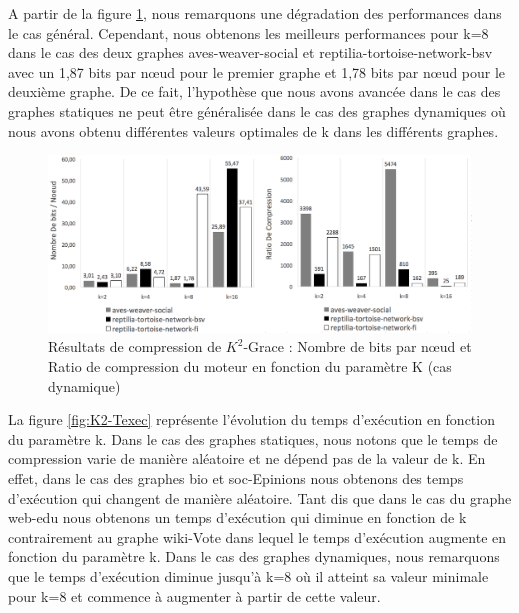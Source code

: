 A partir de la figure \ref{fig:K2-dyn-paraK-NBbits}, nous remarquons une dégradation des performances dans le cas général. Cependant, nous obtenons les meilleurs performances pour k=8 dans le cas des deux graphes aves-weaver-social et reptilia-tortoise-network-bsv avec un 1,87 bits par nœud pour le premier graphe et 1,78 bits par nœud pour le deuxième graphe. De ce fait, l'hypothèse que nous avons avancée dans le cas des graphes statiques ne peut être généralisée dans le cas des graphes dynamiques où nous avons obtenu différentes valeurs optimales de k dans les différents graphes. 
\begin{figure}[H]
	\centering
	\includegraphics[scale=0.38]{ressources/image/ratioik2.png}
	
	\caption{Résultats de compression de $K^2$-Grace : Nombre de bits par nœud et Ratio de compression  du moteur en fonction du paramètre K (cas dynamique)}
	\label{fig:K2-dyn-paraK-NBbits}
\end{figure}	
	

La figure \ref{fig:K2-Texec} représente l'évolution du temps d'exécution en fonction du paramètre k. Dans le cas des graphes statiques, nous notons que le temps de compression varie de manière aléatoire et ne dépend pas de la valeur de k. En effet, dans le cas des graphes bio et soc-Epinions nous obtenons des temps d'exécution qui changent de manière aléatoire. Tant dis que dans le cas du graphe web-edu nous obtenons un temps d'exécution qui diminue en fonction de k contrairement au graphe wiki-Vote dans lequel le temps d'exécution  augmente en fonction du paramètre k. Dans le cas des graphes dynamiques, nous remarquons que le temps d'exécution diminue jusqu'à k=8 où il atteint sa valeur minimale pour k=8 et commence à augmenter à partir de cette valeur.



